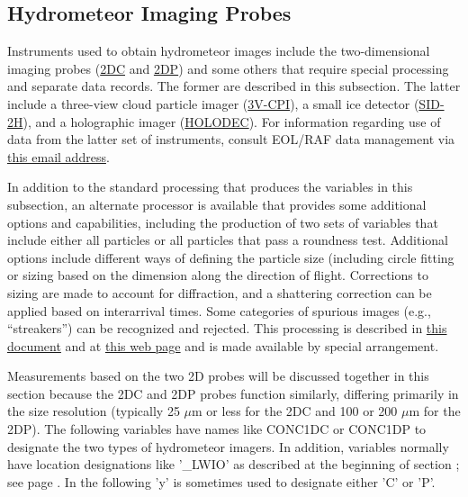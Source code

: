 \subsection{Hydrometeor Imaging Probes\label{subsec:Hydrometeor-Imaging-Probes}}

Instruments used to obtain hydrometeor images include the two-dimensional
imaging probes (\href{https://www.eol.ucar.edu/instruments/two-dimensional-optical-array-cloud-probe}{2DC}
and \href{https://www.eol.ucar.edu/instruments/two-dimensional-optical-array-precipitation-probe}{2DP})
and some others that require special processing and separate data
records. The former are described in this subsection. The latter include
a three-view cloud particle imager (\href{https://www.eol.ucar.edu/instruments/three-view-cloud-particle-imager}{3V-CPI}),
a small ice detector (\href{https://www.eol.ucar.edu/instruments/small-ice-detector-version-2-hiaper}{SID-2H}),
and a holographic imager (\href{https://www.eol.ucar.edu/instruments/holographic-detector-clouds}{HOLODEC}).
For information regarding use of data from the latter set of instruments,
consult EOL/RAF data management via \href{mailto:mailto:raf-dm\%40eol.ucar.edu}{this email address}.

In addition to the standard processing that produces the variables
in this subsection, an alternate processor is available that provides
some additional options and capabilities, including the production
of two sets of variables that include either all particles or all
particles that pass a roundness test. Additional options include different
ways of defining the particle size (including circle fitting or sizing
based on the dimension along the direction of flight. Corrections
to sizing are made to account for diffraction, and a shattering correction
can be applied based on interarrival times. Some categories of spurious
images (e.g., ``streakers'') can be recognized and rejected. This
processing is described in \href{https://github.com/NCAR/aircraft_ProcessingAlgorithms/blob/master/www/Bansemer2DProcessing.pdf}{this document}
and at \href{https://www.eol.ucar.edu/software/process2d}{this web page}
and is made available by special arrangement. 

Measurements based on the two 2D probes will be discussed together
in this section because the 2DC and 2DP probes function similarly,
differing primarily in the size resolution (typically 25 $\mu$m or
less for the 2DC and 100 or 200 $\mu$m for the 2DP). The following
variables have names like CONC1DC or CONC1DP to designate the two
types of hydrometeor imagers. In addition, variables normally have
location designations like '\_LWIO' as described at the beginning
of section ; see page \pageref{VariableNames1DProbes}.
In the following 'y' is sometimes used to designate either 'C' or
'P'.

